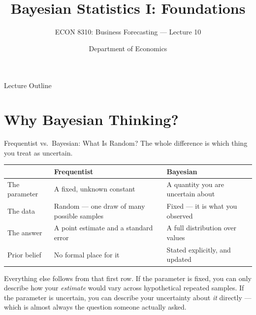 \documentclass[aspectratio=169, 11pt]{beamer}
\title[Bayesian I: Foundations]{Bayesian Statistics I: Foundations}
\subtitle{ECON 8310: Business Forecasting --- Lecture 10}
\author{Department of Economics}
\institute{University of Nebraska at Omaha}
\begin{document}

\begin{frame}
  \titlepage
\end{frame}

\begin{frame}{Lecture Outline}
  \tableofcontents
\end{frame}

\section{Why Bayesian Thinking?}


\begin{frame}{Frequentist vs.\ Bayesian: What Is Random?}
  The whole difference is which thing you treat as uncertain.

  \vspace{0.1cm}
  \begin{center}
    {\small
    \begin{tabular}{p{2.2cm}p{4.9cm}p{5.0cm}}
      \toprule
       & \textbf{Frequentist} & \textbf{Bayesian} \\
      \midrule
      The parameter & A fixed, unknown constant & A quantity you are uncertain about \\[3pt]
      The data & Random --- one draw of many possible samples & Fixed --- it is what you observed \\[3pt]
      The answer & A point estimate and a standard error & A full distribution over values \\[3pt]
      Prior belief & No formal place for it & Stated explicitly, and updated \\
      \bottomrule
    \end{tabular}
    }
  \end{center}

  \vspace{0.1cm}
  Everything else follows from that first row. If the parameter is fixed, you can only describe
  how your \emph{estimate} would vary across hypothetical repeated samples. If the parameter is
  uncertain, you can describe your uncertainty about \emph{it} directly --- which is almost
  always the question someone actually asked.
\end{frame}
\end{document}
